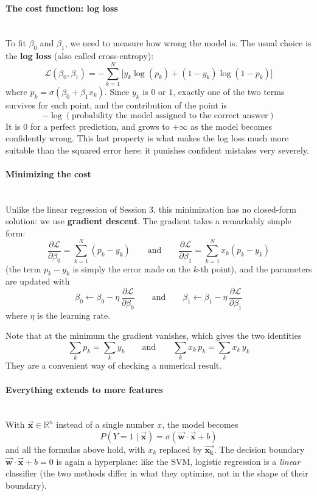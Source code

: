 \documentclass[]{article}
\newcommand{\R}{\mathbb{R}}
\newcommand{\vecx}{ \vec{\mathbf{x}} }
\newcommand{\vecxk}{ \vec{\mathbf{x_k}} }
\newcommand{\vecw}{ \vec{\mathbf{w}} }
\begin{document}
	\paragraph{The cost function: log loss}
	\noindent\\
	To fit $\beta_0$ and $\beta_1$, we need to measure how wrong the model is.
	The usual choice is the \textbf{log loss} (also called cross-entropy):
	$$
	\mathcal{L}(\beta_0, \beta_1) = -\sum_{k=1}^{N} \Big[ y_k \log\left(p_k\right) + \left(1 - y_k\right) \log\left(1 - p_k\right) \Big]
	$$
	where $p_k = \sigma\left(\beta_0 + \beta_1 x_k\right)$.
	Since $y_k$ is $0$ or $1$, exactly one of the two terms survives for each point, and the contribution of the point is
	$$
	-\log\left(\text{probability the model assigned to the correct answer}\right)
	$$
	It is $0$ for a perfect prediction, and grows to $+\infty$ as the model becomes confidently wrong.
	This last property is what makes the log loss much more suitable than the squared error here: it punishes confident mistakes very severely.

	\paragraph{Minimizing the cost}
	\noindent\\
	Unlike the linear regression of Session 3, this minimization has no closed-form solution: we use \textbf{gradient descent}.
	The gradient takes a remarkably simple form:
	$$
	\frac{\partial \mathcal{L}}{\partial \beta_0} = \sum_{k=1}^{N} \left( p_k - y_k \right)
	\qquad \text{and} \qquad
	\frac{\partial \mathcal{L}}{\partial \beta_1} = \sum_{k=1}^{N} x_k \left( p_k - y_k \right)
	$$
	(the term $p_k - y_k$ is simply the error made on the $k$-th point), and the parameters are updated with
	$$
	\beta_0 \leftarrow \beta_0 - \eta \, \frac{\partial \mathcal{L}}{\partial \beta_0}
	\qquad \text{and} \qquad
	\beta_1 \leftarrow \beta_1 - \eta \, \frac{\partial \mathcal{L}}{\partial \beta_1}
	$$
	where $\eta$ is the learning rate.

	Note that at the minimum the gradient vanishes, which gives the two identities
	$$
	\sum_{k} p_k = \sum_{k} y_k
	\qquad \text{and} \qquad
	\sum_{k} x_k \, p_k = \sum_{k} x_k \, y_k
	$$
	They are a convenient way of checking a numerical result.

	\paragraph{Everything extends to more features}
	\noindent\\
	With $\vecx \in \R^n$ instead of a single number $x$, the model becomes
	$$
	P(Y = 1 \mid \vecx) = \sigma\left( \vecw \cdot \vecx + b \right)
	$$
	and all the formulas above hold, with $x_k$ replaced by $\vecxk$.
	The decision boundary $\vecw \cdot \vecx + b = 0$ is again a hyperplane: like the SVM, logistic regression is a \textit{linear} classifier (the two methods differ in what they optimize, not in the shape of their boundary).
\end{document}
